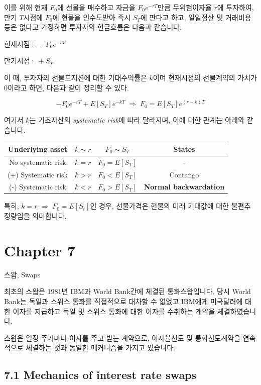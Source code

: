 \documentclass[
  letterpaper,
  DIV=11,
  numbers=noendperiod]{scrreprt}
\begin{document}
이를 위해 현재 \(F_0\)에 선물을 매수하고 자금을 \(F_0e^{-rT}\)만큼
무위험이자율 \(r\)에 투자하여, 만기 \(T\)시점에 \(F_0\)에 현물을
인수도받아 즉시 \(S_T\)에 판다고 하고, 일일정산 및 거래비용 등은 없다고
가정하면 투자자의 현금흐름은 다음과 같습니다.

\(현재시점\;:\;-F_0e^{-rT}\)

\(만기시점\;:\;+S_T\)

이 때, 투자자의 선물포지션에 대한 기대수익률은 \(k\)이며 현재시점의
선물계약의 가치가 0이라고 하면, 다음과 같이 정리할 수 있다.

\[-F_0e^{-rT}+E[S_T]e^{-kT}\;\Rightarrow\;F_0=E[S_T]e^{(r-k)T}\]

여기서 \(k\)는 기초자산의 \emph{systematic risk}에 따라 달라지며, 이에
대한 관계는 아래와 같습니다.

\begin{longtable}[]{@{}cccc@{}}
\toprule\noalign{}
Underlying asset & \(k\sim r\) & \(F_0\sim S_T\) & States \\
\midrule\noalign{}
\endhead
\bottomrule\noalign{}
\endlastfoot
No systematic risk & \(k=r\) & \(F_0=E[S_T]\) & - \\
(+) Systematic risk & \(k>r\) & \(F_0<E[S_T]\) & Contango \\
(-) Systematic risk & \(k<r\) & \(F_0>E[S_T]\) & \textbf{Normal
backwardation} \\
\end{longtable}

특히, \(k=r\;\Rightarrow\;F_0=E[S_t]\)인 경우, 선물가격은 현물의 미래
기대값에 대한 불편추정량임을 의미합니다.

\chapter*{Chapter 7}\label{chapter-7}


스왑, Swaps

최초의 스왑은 1981년 IBM과 World Bank간에 체결된 통화스왑입니다. 당시
World Bank는 독일과 스위스 통화를 직접적으로 대차할 수 없었고 IBM에게
미국달러에 대한 이자를 지급하고 독일 및 스위스 통화에 대한 이자를
수취하는 계약을 체결하였습니다.

스왑은 일정 주기마다 이자를 주고 받는 계약으로, 이자율선도 및
통화선도계약을 연속적으로 체결하는 것과 동일한 메커니즘을 가지고
있습니다.

\section*{7.1 Mechanics of interest rate
swaps}\label{mechanics-of-interest-rate-swaps}
\end{document}
